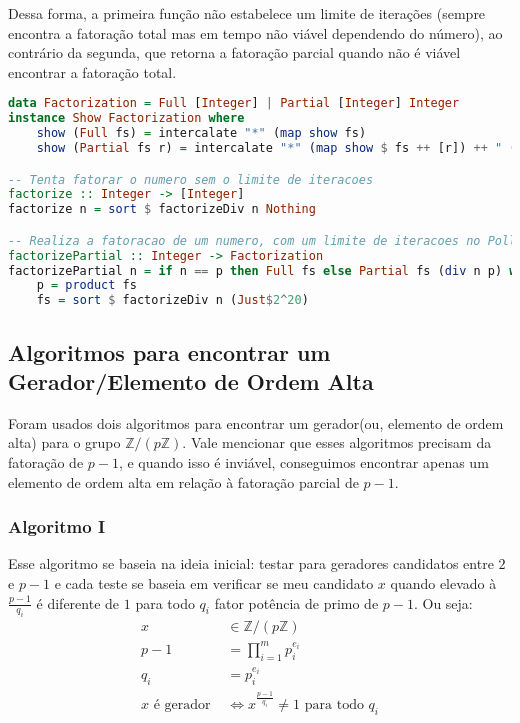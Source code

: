 \documentclass{article}
\begin{document}
Dessa forma, a primeira função não estabelece um limite de iterações (sempre encontra a fatoração total mas em tempo não viável dependendo do número), ao contrário da segunda, que retorna a fatoração parcial quando não é viável encontrar a fatoração total.  

\noindent\hspace{0.03\linewidth}
\begin{minipage}{0.9\linewidth}
\begin{lstlisting}[language=haskell,caption=Fatoração]
data Factorization = Full [Integer] | Partial [Integer] Integer
instance Show Factorization where
    show (Full fs) = intercalate "*" (map show fs)
    show (Partial fs r) = intercalate "*" (map show $ fs ++ [r]) ++ " (fatoracao parcial)"

-- Tenta fatorar o numero sem o limite de iteracoes
factorize :: Integer -> [Integer]
factorize n = sort $ factorizeDiv n Nothing

-- Realiza a fatoracao de um numero, com um limite de iteracoes no Pollard Rho
factorizePartial :: Integer -> Factorization
factorizePartial n = if n == p then Full fs else Partial fs (div n p) where
    p = product fs
    fs = sort $ factorizeDiv n (Just$2^20)
\end{lstlisting}
\end{minipage}

\subsection{Algoritmos para encontrar um Gerador/Elemento de Ordem Alta}
Foram usados dois algoritmos para encontrar um gerador(ou, elemento de ordem alta) para o grupo $\mathbb{Z}/(p\mathbb{Z})$. Vale mencionar que esses algoritmos precisam da fatoração de $p-1$, e quando isso é inviável, conseguimos encontrar apenas um elemento de ordem alta em relação à fatoração parcial de $p-1$.

\subsubsection{Algoritmo I}
Esse algoritmo se baseia na ideia inicial: testar para geradores candidatos entre $2$ e $p-1$ e cada teste se baseia em verificar se meu candidato $x$ quando elevado à $\frac{p-1}{q_i}$ é diferente de $1$ para todo $q_i$ fator potência de primo de $p-1$.
Ou seja:
\begin{align*}
    x &\in \mathbb{Z}/(p\mathbb{Z})\\
    p - 1 &= \prod_{i=1}^{m}p_i^{e_i}\\
    q_i &= p_i^{e_i}\\
    x \text{ é gerador } &\iff x^{\frac{p-1}{q_i}} \neq 1 \text{ para todo } q_i
\end{align*}
\end{document}
